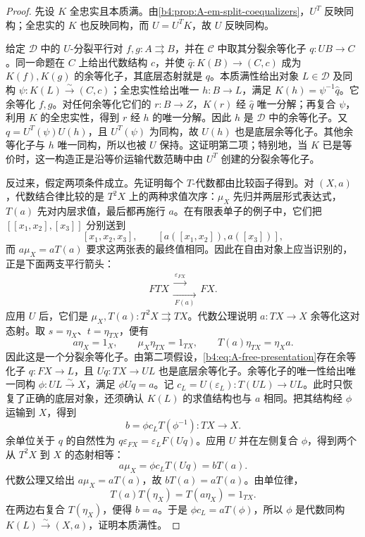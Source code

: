 \begin{proof}
	先设 \(K\) 全忠实且本质满。由\cref{b4:prop:A-em-split-coequalizers}，\(U^T\) 反映同构；全忠实的 \(K\) 也反映同构，而 \(U=U^TK\)，故 \(U\) 反映同构。

	给定 \(\mathcal D\) 中的 \(U\)-分裂平行对 \(f,g:A\rightrightarrows B\)，并在 \(\mathcal C\) 中取其分裂余等化子 \(q:UB\to C\)。同一命题在 \(C\) 上给出代数结构 \(c\)，并使 \(\widehat q:K(B)\to(C,c)\) 成为 \(K(f),K(g)\) 的余等化子，其底层态射就是 \(q\)。本质满性给出对象 \(L\in\mathcal D\) 及同构 \(\psi:K(L)\xrightarrow{\sim}(C,c)\)；全忠实性给出唯一 \(h:B\to L\)，满足 \(K(h)=\psi^{-1}\widehat q\)。它余等化 \(f,g\)。对任何余等化它们的 \(r:B\to Z\)，\(K(r)\) 经 \(\widehat q\) 唯一分解；再复合 \(\psi\)，利用 \(K\) 的全忠实性，得到 \(r\) 经 \(h\) 的唯一分解。因此 \(h\) 是 \(\mathcal D\) 中的余等化子。又 \(q=U^T(\psi)U(h)\)，且 \(U^T(\psi)\) 为同构，故 \(U(h)\) 也是底层余等化子。其他余等化子与 \(h\) 唯一同构，所以也被 \(U\) 保持。这证明第二项；特别地，当 \(K\) 已是等价时，这一构造正是沿等价运输代数范畴中由 \(U^T\) 创建的分裂余等化子。

	反过来，假定两项条件成立。先证明每个 \(T\)-代数都由比较函子得到。对 \((X,a)\)，代数结合律比较的是 \(T^2X\) 上的两种求值次序：\(\mu_X\) 先归并两层形式表达式，\(T(a)\) 先对内层求值，最后都再施行 \(a\)。在有限表单子的例子中，它们把 \([[x_1,x_2],[x_3]]\) 分别送到
	\[
		[x_1,x_2,x_3],\qquad [a([x_1,x_2]),a([x_3])],
	\]
	而 \(a\mu_X=aT(a)\) 要求这两张表的最终值相同。因此在自由对象上应当识别的，正是下面两支平行箭头：
	\begin{equation}\label{b4:eq:A-free-presentation}
		FTX \mathrel{\substack{\xrightarrow{\ \varepsilon_{FX}\ }\\[-0.4ex]
				\xrightarrow[\ F(a)\ ]{}}} FX.
	\end{equation}
	应用 \(U\) 后，它们是 \(\mu_X,T(a):T^2X\rightrightarrows TX\)。代数公理说明 \(a:TX\to X\) 余等化这对态射。取 \(s=\eta_X\)、\(t=\eta_{TX}\)，便有
	\[
		a\eta_X=1_X,\qquad \mu_X\eta_{TX}=1_{TX},\qquad T(a)\eta_{TX}=\eta_Xa.
	\]
	因此这是一个分裂余等化子。由第二项假设，\eqref{b4:eq:A-free-presentation}存在余等化子 \(q:FX\to L\)，且 \(Uq:TX\to UL\) 也是底层余等化子。余等化子的唯一性给出唯一同构 \(\phi:UL\xrightarrow{\sim}X\)，满足 \(\phi Uq=a\)。记 \(c_L=U(\varepsilon_L):T(UL)\rightarrow UL\)。此时只恢复了正确的底层对象，还须确认 \(K(L)\) 的求值结构也与 \(a\) 相同。把其结构经 \(\phi\) 运输到 \(X\)，得到
	\[
		b=\phi c_LT(\phi^{-1}):TX\longrightarrow X.
	\]
	余单位关于 \(q\) 的自然性为 \(q\varepsilon_{FX}=\varepsilon_LF(Uq)\)。应用 \(U\) 并在左侧复合 \(\phi\)，得到两个从 \(T^2X\) 到 \(X\) 的态射相等：
	\[
		a\mu_X=\phi c_LT(Uq)=bT(a).
	\]
	代数公理又给出 \(a\mu_X=aT(a)\)，故 \(bT(a)=aT(a)\)。由单位律，
	\[
		T(a)T(\eta_X)=T(a\eta_X)=1_{TX}.
	\]
	在两边右复合 \(T(\eta_X)\)，便得 \(b=a\)。于是 \(\phi c_L=aT(\phi)\)，所以 \(\phi\) 是代数同构 \(K(L)\xrightarrow{\sim}(X,a)\)，证明本质满性。


\end{proof}
